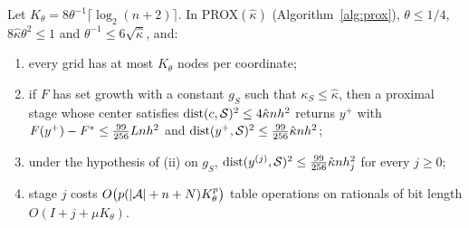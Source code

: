 \begin{lemma}\label{lem:proximal}
Let $K_\theta=8\theta^{-1}\lceil\log_2(n+2)\rceil$. In PROX$(\hat\kappa)$
(Algorithm~\ref{alg:prox}), $\theta\le1/4$, $8\hat\kappa\theta^2\le1$ and
$\theta^{-1}\le6\sqrt{\hat\kappa}$, and:
\begin{enumerate}[label=(\roman*)]
\item every grid has at most $K_\theta$ nodes per coordinate;
\item if $F$ has set growth with a constant $g_S$ such that
$\kappa_S\le\hat\kappa$, then a proximal stage whose center satisfies
$\operatorname{dist}(c,\mathcal S)^2\le4\hat\kappa nh^2$ returns $y^+$ with
$F(y^+)-F^{*}\le\frac{99}{256}Lnh^2$ and
$\operatorname{dist}(y^+,\mathcal S)^2\le\frac{99}{256}\hat\kappa nh^2$;
\item under the hypothesis of (ii) on $g_S$,
$\operatorname{dist}(y^{(j)},\mathcal S)^2\le\frac{99}{256}\hat\kappa nh_j^2$ for every
$j\ge0$;
\item stage $j$ costs $O\bigl(p(\lvert \mathcal A\rvert+n+N)K_\theta^p\bigr)$ table
operations on rationals of bit length $O(I+j+\mu K_\theta)$.
\end{enumerate}
\end{lemma}

